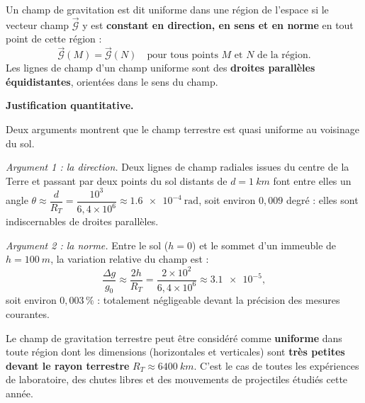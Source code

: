 \documentclass[11pt]{article}
\newcommand{\cle}[1]{{\popxbold\color{popdark}#1}}
\begin{document}
\begin{definition}
Un champ de gravitation est dit \cle{uniforme} dans une région de l'espace si le vecteur champ $\vec{\mathcal{G}}$ y est \textbf{constant en direction, en sens et en norme} en tout point de cette région :
\[
\vec{\mathcal{G}}(M) = \vec{\mathcal{G}}(N) \quad \text{pour tous points } M \text{ et } N \text{ de la région.}
\]
Les lignes de champ d'un champ uniforme sont des \textbf{droites parallèles équidistantes}, orientées dans le sens du champ.
\end{definition}

\textbf{Justification quantitative.}\par
Deux arguments montrent que le champ terrestre est quasi uniforme au voisinage du sol.

\emph{Argument 1 : la direction.} Deux lignes de champ radiales issues du centre de la Terre et passant par deux points du sol distants de $d = \SI{1}{km}$ font entre elles un angle $\theta \approx \dfrac{d}{R_T} = \dfrac{10^3}{6{,}4\times 10^6} \approx \num{1,6e-4}~\text{rad}$, soit environ $0{,}009$ degré : elles sont indiscernables de droites parallèles.

\emph{Argument 2 : la norme.} Entre le sol ($h=0$) et le sommet d'un immeuble de $h = \SI{100}{m}$, la variation relative du champ est :
\[
\frac{\Delta g}{g_0} \approx \frac{2h}{R_T} = \frac{2 \times 10^2}{6{,}4\times 10^6} \approx \num{3,1e-5},
\]
soit environ $0{,}003\,\%$ : totalement négligeable devant la précision des mesures courantes.

\begin{aretenir}
Le champ de gravitation terrestre peut être considéré comme \textbf{uniforme} dans toute région dont les dimensions (horizontales et verticales) sont \textbf{très petites devant le rayon terrestre} $R_T \approx \SI{6400}{km}$. C'est le cas de toutes les expériences de laboratoire, des chutes libres et des mouvements de projectiles étudiés cette année.
\end{aretenir}
\end{document}
